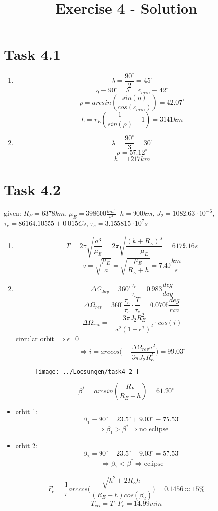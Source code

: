 \documentclass[a4paper,12pt]{article}
\title{Exercise 4 - Solution}
\author{}
\date{}
\begin{document}
\maketitle

\section*{Task 4.1}
\begin{enumerate}
 \item \[\lambda = \frac{90^{\circ}}{2}= 45^{\circ}\]
 \[\eta = 90^{\circ} - \lambda - \varepsilon_{min} = 42^{\circ}\]
 \[\rho = arcsin\left(\frac{sin(\eta)}{cos(\varepsilon_{min})}\right) = 42.07^{\circ}\]
 \[h = r_E\left(\frac{1}{sin(\rho)}-1\right) = 3141km\]
 \item \[\lambda = \frac{90^{\circ}}{3}= 30^{\circ}\]
 \[\rho = 57.12^{\circ}\]
 \[h = 1217km\]
\end{enumerate}


\section*{Task 4.2}
given: $R_E = 6378km$, $\mu_E = 398600 \frac{km^3}{s^2}$, $h=900km$, $J_2 = 1082.63 \cdot 10^{-6}$, $\tau_e = 86164.10555+0.015C s$, $\tau_{s} = 3.155815\cdot10^7s$
\begin{enumerate}
 \item \[T = 2\pi\sqrt{\frac{a^3}{\mu_E}} = 2\pi\sqrt{\frac{(h+R_E)^3}{\mu_E}} = 6179.16s \]
 \[v = \sqrt{\frac{\mu_E}{a}} = \sqrt{\frac{\mu_E}{R_E + h}} = 7.40 \frac{km}{s}\]
 \item \[\Delta \Omega_{day} = 360^{\circ}\frac{\tau_e}{\tau_{s}} = 0.983 \frac{deg}{day}\]
 \[\Delta \Omega_{rev} = 360^{\circ}\frac{\tau_e}{\tau_{s}}\cdot \frac{T}{\tau_e} = 0.0705 \frac{deg}{rev}\]
 \[\Delta \Omega_{rev} = -\frac{3\pi J_2R_E^2}{a^2(1-\epsilon^2)^2}\cdot cos(i) \] circular orbit $\Rightarrow \epsilon$=0
 \[\Rightarrow i = arccos\bigg(-\frac{\Delta \Omega_{rev}a^2}{3\pi J_2R_E^2}\bigg) = 99.03^{\circ}\]
 
 \begin{figure}[!ht]
  \centering
  \texttt{[image: ../Loesungen/task4\_2\_]}
 \end{figure}
\end{enumerate}
 \[\beta^* = arcsin(\frac{R_E}{R_E + h}) = 61.20^{\circ}\]
 \begin{itemize}
  \item orbit 1: \[\beta_1 = 90^{\circ} - 23.5^{\circ} + 9.03^{\circ} = 75.53^{\circ}\]
  \[\Rightarrow \beta_1 > \beta^* \Rightarrow \text{no eclipse} \]
  \item orbit 2: \[\beta_2 = 90^{\circ} - 23.5^{\circ} - 9.03^{\circ} = 57.53^{\circ}\]
  \[\Rightarrow \beta_2 < \beta^* \Rightarrow \text{eclipse} \]
 \end{itemize}
 \[F_e = \frac{1}{\pi}arccos\bigg(\frac{\sqrt{h^2 + 2R_Eh}}{(R_E + h)cos(\beta_2)}\bigg) = 0.1456 \approx 15\%\]
 \[T_{ecl} = T\cdot F_e = 14.99 min\]
 \vspace*{10pt}
 
\end{document}

